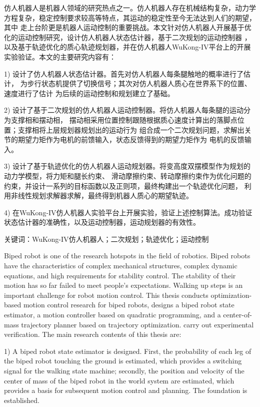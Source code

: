 \cleardoublepage
{}

仿人机器人是机器人领域的研究热点之一。仿人机器人存在机械结构复杂，动力学
方程复杂，稳定控制要求较高等特点，其运动的稳定性至今无法达到人们的期望，其中
走上台阶更是机器人运动控制的重要挑战。本文针对仿人机器人开展基于优化的运动控制研究，设计仿人机器人状态估计器，基于二次规划的运动控制器
，以及基于轨迹优化的质心轨迹规划器，并在仿人机器人WuKong-IV平台上的开展实验验证。本文的主要研究内容有：

1) 设计了仿人机器人状态估计器。首先对仿人机器人每条腿触地的概率进行了估计，
为步行状态机提供了切换信号；其次对仿人机器人质心在世界系下的位置、速度进行了估计
为后续的运动控制和规划建立了基础。

2) 设计了基于二次规划的仿人机器人运动控制器。将仿人机器人每条腿的运动分为支撑相和摆动相，
摆动相采用位置控制跟随根据质心速度计算出的落脚点位置；支撑相将上层规划器规划出的运动行为
组合成一个二次规划问题，求解出关节的期望力矩作为电机的前馈输入，状态反馈得到的期望力矩作为
电机的反馈输入。

3) 设计了基于轨迹优化的仿人机器人运动规划器。将变高度双摆模型作为规划的动力学模型，将力矩和腿长约束、
滑动摩擦约束、转动摩擦约束作为优化问题的约束，并设计一系列的目标函数以及正则项，最终构建出一个轨迹优化问题，
利用非线性规划求解器求解，最终得到机器人质心的期望轨迹。

4) 在WuKong-IV仿人机器人实验平台上开展实验，验证上述控制算法。成功验证
状态估计器的准确性，以及运动控制器，运动规划器的有效性。

关键词：WuKong-IV仿人机器人；二次规划；轨迹优化；运动控制

\cleardoublepage
{}

Biped robot is one of the research hotspots in the field of robotics. Biped robots have the characteristics of complex mechanical structures, 
complex dynamic equations, and high requirements for stability control. The stability of their motion has so far failed to meet people's expectations. 
Walking up steps is an important challenge for robot motion control. This thesis conducts optimization-based motion control research for biped robots, 
designs a biped robot state estimator, a motion controller based on quadratic programming, and a center-of-mass trajectory planner based on trajectory optimization. 
carry out experimental verification. The main research contents of this thesis are:

1) A biped robot state estimator is designed. First, the probability of each leg of the biped robot touching the ground is estimated, 
which provides a switching signal for the walking state machine; secondly, the position and velocity of the center of mass of the biped robot in the world system are estimated, 
which provides a basis for subsequent motion control and planning. The foundation is established.

